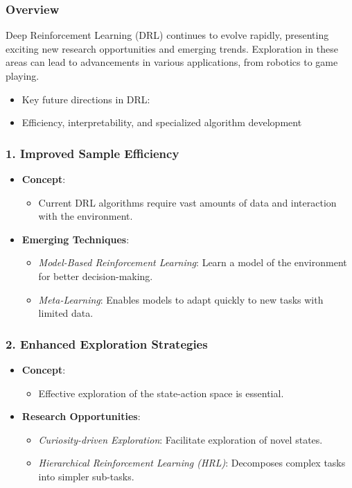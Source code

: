 \documentclass{beamer}
\begin{document}
\begin{frame}[fragile]
    \frametitle{Overview}
    Deep Reinforcement Learning (DRL) continues to evolve rapidly, presenting exciting new research opportunities and emerging trends. Exploration in these areas can lead to advancements in various applications, from robotics to game playing. 
    \begin{itemize}
        \item Key future directions in DRL:
        \item Efficiency, interpretability, and specialized algorithm development
    \end{itemize}
\end{frame}

\begin{frame}[fragile]
    \frametitle{1. Improved Sample Efficiency}
    \begin{itemize}
        \item \textbf{Concept}:
        \begin{itemize}
            \item Current DRL algorithms require vast amounts of data and interaction with the environment.
        \end{itemize}
        \item \textbf{Emerging Techniques}:
        \begin{itemize}
            \item \textit{Model-Based Reinforcement Learning}: Learn a model of the environment for better decision-making.
            \item \textit{Meta-Learning}: Enables models to adapt quickly to new tasks with limited data.
        \end{itemize}
    \end{itemize}
\end{frame}

\begin{frame}[fragile]
    \frametitle{2. Enhanced Exploration Strategies}
    \begin{itemize}
        \item \textbf{Concept}:
        \begin{itemize}
            \item Effective exploration of the state-action space is essential.
        \end{itemize}
        \item \textbf{Research Opportunities}:
        \begin{itemize}
            \item \textit{Curiosity-driven Exploration}: Facilitate exploration of novel states.
            \item \textit{Hierarchical Reinforcement Learning (HRL)}: Decomposes complex tasks into simpler sub-tasks.
        \end{itemize}
    \end{itemize}
\end{frame}
\end{document}
